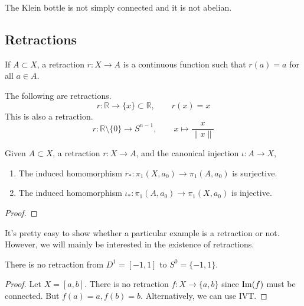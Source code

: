   \begin{example}
    The Klein bottle is not simply connected and it is not abelian. 
  \end{example}

\subsection{Retractions}

  \begin{definition}[Retraction]
    If $A \subset X$, a retraction $r: X \to A$ is a continuous function such that $r(a) = a$ for all $a \in A$.  
  \end{definition}

  \begin{example}
    The following are retractions. 
    \begin{equation}
      r: \mathbb{R} \to \{x\} \subset \mathbb{R}, \qquad r(x) = x
    \end{equation}
    This is also a retraction. 
    \begin{equation}
      r: \mathbb{R} \setminus \{0\} \to S^{n-1}, \qquad x \mapsto \frac{x}{\|x\|} 
    \end{equation}
  \end{example}

  \begin{lemma}
    Given $A \subset X$, a retraction $r: X \to A$, and the canonical injection $\iota: A \to X$, 
    \begin{enumerate}
      \item The induced homomorphism $r_\ast: \pi_1 (X, a_0) \to \pi_1 (A, a_0)$ is surjective. 
      \item The induced homomorphism $\iota_\ast: \pi_1 (A, a_0) \to \pi_1 (X, a_0)$ is injective. 
    \end{enumerate}
  \end{lemma}
  \begin{proof}
    
  \end{proof}

  It's pretty easy to show whether a particular example is a retraction or not. However, we will mainly be interested in the existence of retractions. 

  \begin{theorem}
    There is no retraction from $D^1 = [-1, 1]$ to $S^0 = \{-1, 1\}$. 
  \end{theorem}
  \begin{proof}
    Let $X = [a, b]$. There is no retraction $f: X \to \{a, b\}$ since $\operatorname{Im}(f)$ must be connected. But $f(a) = a, f(b) = b$. Alternatively, we can use IVT. 
  \end{proof}

